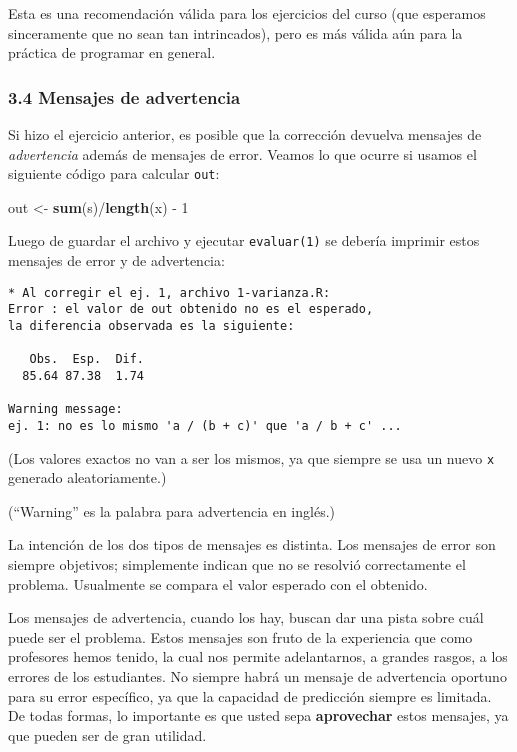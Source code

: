 \documentclass[]{article}
\newenvironment{Shaded}{}{}
\newcommand{\KeywordTok}[1]{\textcolor[rgb]{0.00,0.44,0.13}{\textbf{{#1}}}}
\newcommand{\DecValTok}[1]{\textcolor[rgb]{0.25,0.63,0.44}{{#1}}}
\newcommand{\NormalTok}[1]{{#1}}
\begin{document}
Esta es una recomendación válida para los ejercicios del curso (que
esperamos sinceramente que no sean tan intrincados), pero es más válida
aún para la práctica de programar en general.

\subsubsection{3.4 Mensajes de advertencia}

Si hizo el ejercicio anterior, es posible que la corrección devuelva
mensajes de \emph{advertencia} además de mensajes de error. Veamos lo
que ocurre si usamos el siguiente código para calcular \texttt{out}:

\begin{Shaded}
\begin{Highlighting}[]
\NormalTok{out <- }\KeywordTok{sum}\NormalTok{(s)/}\KeywordTok{length}\NormalTok{(x) - }\DecValTok{1}
\end{Highlighting}
\end{Shaded}
Luego de guardar el archivo y ejecutar \texttt{evaluar(1)} se debería
imprimir estos mensajes de error y de advertencia:

\begin{verbatim}
* Al corregir el ej. 1, archivo 1-varianza.R:
Error : el valor de out obtenido no es el esperado,
la diferencia observada es la siguiente:

   Obs.  Esp.  Dif. 
  85.64 87.38  1.74

Warning message:
ej. 1: no es lo mismo 'a / (b + c)' que 'a / b + c' ...
\end{verbatim}
(Los valores exactos no van a ser los mismos, ya que siempre se usa un
nuevo \texttt{x} generado aleatoriamente.)

(``Warning'' es la palabra para advertencia en inglés.)

La intención de los dos tipos de mensajes es distinta. Los mensajes de
error son siempre objetivos; simplemente indican que no se resolvió
correctamente el problema. Usualmente se compara el valor esperado con
el obtenido.

Los mensajes de advertencia, cuando los hay, buscan dar una pista sobre
cuál puede ser el problema. Estos mensajes son fruto de la experiencia
que como profesores hemos tenido, la cual nos permite adelantarnos, a
grandes rasgos, a los errores de los estudiantes. No siempre habrá un
mensaje de advertencia oportuno para su error específico, ya que la
capacidad de predicción siempre es limitada. De todas formas, lo
importante es que usted sepa \textbf{aprovechar} estos mensajes, ya que
pueden ser de gran utilidad.
\end{document}
